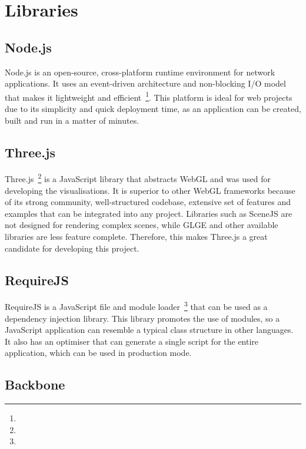 \section{Libraries} {
\label{sec:libraries}
	
	\subsection{Node.js} {
	\label{sec:nodejs}
	
		Node.js is an open-source, cross-platform runtime environment for network applications. It uses an event-driven architecture and non-blocking I/O model that makes it lightweight and efficient~\footnote{}. This platform is ideal for web projects due to its simplicity and quick deployment time, as an application can be created, built and run in a matter of minutes.

	}

	\subsection{Three.js} {
	\label{sec:threejs}

		Three.js~\footnote{} is a JavaScript library that abstracts WebGL and was used for developing the visualisations. It is superior to other WebGL frameworks because of its strong community, well-structured codebase, extensive set of features and examples that can be integrated into any project. Libraries such as SceneJS are not designed for rendering complex scenes, while GLGE and other available libraries are less feature complete. Therefore, this makes Three.js a great candidate for developing this project.

	}

	\subsection{RequireJS} {
	\label{sec:requirejs}
		
		RequireJS is a JavaScript file and module loader~\footnote{} that can be used as a dependency injection library. This library promotes the use of modules, so a JavaScript application can resemble a typical class structure in other languages. It also has an optimiser that can generate a single script for the entire application, which can be used in production mode.

	}

	\subsection{Backbone} {
	\label{sec:backbone}

}}
